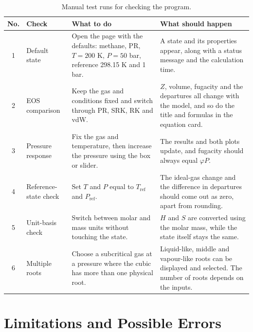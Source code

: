 \documentclass[11pt,a4paper]{article}
\begin{document}
\begin{table}[H]
\centering
\small
\renewcommand{\arraystretch}{1.15}
\begin{tabularx}{\textwidth}{@{}c >{\raggedright\arraybackslash}p{2.7cm} >{\raggedright\arraybackslash}X >{\raggedright\arraybackslash}X@{}}
\toprule
\textbf{No.} & \textbf{Check} & \textbf{What to do} & \textbf{What should happen} \\
\midrule
1 & Default state &
Open the page with the defaults: methane, PR, $T = 200$ K, $P = 50$ bar, reference 298.15 K and 1 bar. &
A state and its properties appear, along with a status message and the calculation time. \\
2 & EOS comparison &
Keep the gas and conditions fixed and switch through PR, SRK, RK and vdW. &
$Z$, volume, fugacity and the departures all change with the model, and so do the title and formulas in the equation card. \\
3 & Pressure response &
Fix the gas and temperature, then increase the pressure using the box or slider. &
The results and both plots update, and fugacity should always equal $\varphi P$. \\
4 & Reference-state check &
Set $T$ and $P$ equal to $T_{\mathrm{ref}}$ and $P_{\mathrm{ref}}$. &
The ideal-gas change and the difference in departures should come out as zero, apart from rounding. \\
5 & Unit-basis check &
Switch between molar and mass units without touching the state. &
$H$ and $S$ are converted using the molar mass, while the state itself stays the same. \\
6 & Multiple roots &
Choose a subcritical gas at a pressure where the cubic has more than one physical root. &
Liquid-like, middle and vapour-like roots can be displayed and selected. The number of roots depends on the inputs. \\
\bottomrule
\end{tabularx}
\caption{Manual test runs for checking the program.}
\label{tab:tests}
\end{table}

\section{Limitations and Possible Errors}
\end{document}
